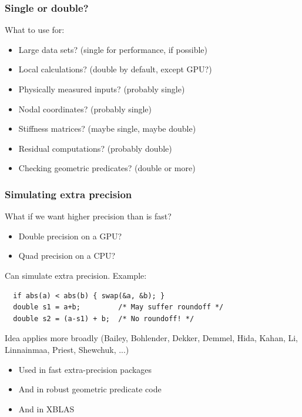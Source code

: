 \documentclass{beamer}
\begin{document}
\begin{frame}
  \frametitle{Single or double?}

  What to use for:
  \begin{itemize}
  \item Large data sets?  (single for performance, if possible)
  \item Local calculations?  (double by default, except GPU?)
  \item Physically measured inputs?  (probably single)
  \item Nodal coordinates?  (probably single)
  \item Stiffness matrices?  (maybe single, maybe double)
  \item Residual computations?  (probably double)
  \item Checking geometric predicates?  (double or more)
  \end{itemize}
\end{frame}


\begin{frame}[fragile]
  \frametitle{Simulating extra precision}
  
  What if we want higher precision than is fast?
  \begin{itemize}
  \item Double precision on a GPU?
  \item Quad precision on a CPU?
  \end{itemize}
  Can simulate extra precision.  Example:
\begin{lstlisting}
  if abs(a) < abs(b) { swap(&a, &b); }
  double s1 = a+b;         /* May suffer roundoff */
  double s2 = (a-s1) + b;  /* No roundoff! */
\end{lstlisting}
  Idea applies more broadly (Bailey, Bohlender, Dekker, Demmel, Hida,
  Kahan, Li, Linnainmaa, Priest, Shewchuk, ...)
  \begin{itemize}
  \item Used in fast extra-precision packages
  \item And in robust geometric predicate code
  \item And in XBLAS
  \end{itemize}

\end{frame}
\end{document}
